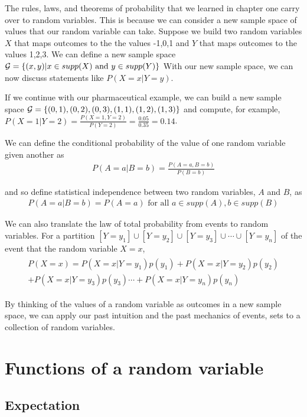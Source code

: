 The rules, laws, and theorems of probability that we learned in chapter one carry over to random variables.
This is because we can consider a new sample space of values that our random variable can take. 
Suppose we build two random variables $X$ that maps outcomes to the the values -1,0,1 and $Y$ that maps outcomes to the values 1,2,3. 
We can define a new sample space $\mathcal{G} = \{(x,y) | x \in supp(X) \text{ and } y \in supp(Y) \}$
With our new sample space, we can now discuss statements like $P(X = x | Y = y)$. 

\ex If we continue with our pharmaceutical example, we can build a new sample space $\mathcal{G} = \{(0,1),(0,2),(0,3),(1,1),(1,2),(1,3)\}$ and compute, for example, $P(X=1 | Y=2) = \frac{P(X=1,Y=2)}{P(Y=2)} = \frac{0.05}{0.35} = 0.14$.

We can define the conditional probability of the value of one random variable given another as 
\begin{align}
    P(A =a | B =b) = \frac{P(A=a,B=b)}{P(B=b)}
\end{align}

and so define statistical independence between two random variables, $A$ and $B$, as 
\begin{align}
    P(A = a | B=b) = P(A = a) \text{ for all } a \in supp(A),b \in supp(B)    
\end{align}

We can also translate the law of total probability from events to random variables.
For a partition $[Y=y_{1}] \cup [Y=y_{2}] \cup [Y=y_{3}] \cup \cdots \cup [Y=y_{n}]$ of the event that the random variable $X=x$,
\begin{align}
    \begin{aligned}
    P(X=x) = P(X=x|Y=y_{1})p(y_{1}) + P(X=x|Y=y_{2})p(y_{2})\\ + P(X=x|Y=y_{3})p(y_{3}) \cdots + P(X=x|Y=y_{n})p(y_{n})
    \end{aligned}
\end{align}

By thinking of the values of a random variable as outcomes in a new sample space, we can apply our past intuition and the past mechanics of events, sets to a collection of random variables.

\section{Functions of a random variable}

\subsection{Expectation}

